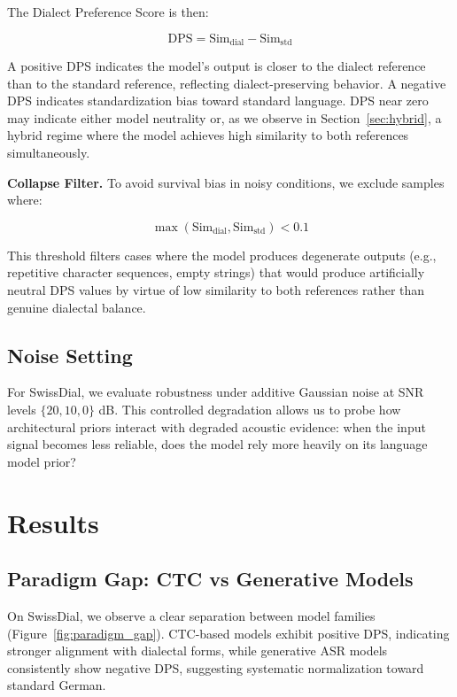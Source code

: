 \documentclass[11pt]{article}
\begin{document}
The Dialect Preference Score is then:

\begin{equation}
\text{DPS} = \text{Sim}_{\text{dial}} - \text{Sim}_{\text{std}}
\end{equation}

A positive DPS indicates the model's output is closer to the dialect reference than to the standard reference, reflecting dialect-preserving behavior. A negative DPS indicates standardization bias toward standard language. DPS near zero may indicate either model neutrality or, as we observe in Section~\ref{sec:hybrid}, a hybrid regime where the model achieves high similarity to both references simultaneously.

\textbf{Collapse Filter.} To avoid survival bias in noisy conditions, we exclude samples where:

\begin{equation}
\max(\text{Sim}_{\text{dial}}, \text{Sim}_{\text{std}}) < 0.1
\end{equation}

This threshold filters cases where the model produces degenerate outputs (e.g., repetitive character sequences, empty strings) that would produce artificially neutral DPS values by virtue of low similarity to both references rather than genuine dialectal balance.

\subsection{Noise Setting}

For SwissDial, we evaluate robustness under additive Gaussian noise at SNR levels $\{20, 10, 0\}$ dB. This controlled degradation allows us to probe how architectural priors interact with degraded acoustic evidence: when the input signal becomes less reliable, does the model rely more heavily on its language model prior?

\section{Results}

\subsection{Paradigm Gap: CTC vs Generative Models}

On SwissDial, we observe a clear separation between model families (Figure~\ref{fig:paradigm_gap}). 
CTC-based models exhibit positive DPS, indicating stronger alignment with dialectal forms, while generative ASR models consistently show negative DPS, suggesting systematic normalization toward standard German.
\end{document}
